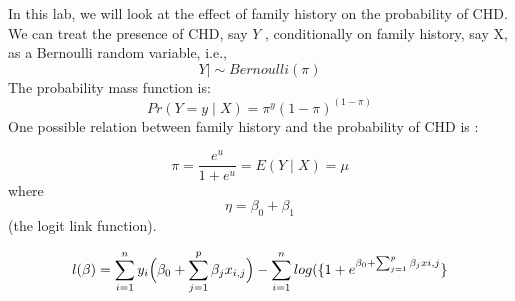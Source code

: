 \documentclass[11pt,twoside]{article}
\begin{document}
In this lab, we will look at the effect of family history on the probability of CHD. We can treat the
presence of CHD, say $Y$ , conditionally on family history, say X, as a Bernoulli random variable,
i.e.,
$$ Y \mid \sim Bernoulli(\pi)$$
The probability mass function is:
$$ Pr(Y=y \mid X) = \pi^{y}(1-\pi)^{(1-\pi)} $$
One possible relation between family history and the probability of CHD is :

$$ \pi = \frac{e^{u}}{1+e^{u}} = E(Y \mid X)= \mu $$
where $$ \eta = \beta_0 + \beta_1$$
(the logit link function).

$$ l(\mathbf{\beta}) = \sum_{i=1}^{n}y_i \Bigl( \beta_0 + \sum_{j=1}^{p} \beta_j
x_{i,j} \Bigr) - \sum_{i=1}^{n}log( \{ 1+e^{\beta_0 + \sum_{j=1}^{p} \beta_j
x{i,j}} \} $$
\end{document}
